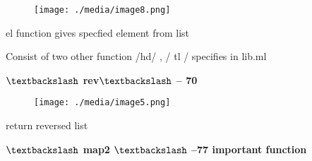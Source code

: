 \documentclass[12pt]{article}
\renewcommand{\_}{\kern-1.5pt\textunderscore\kern-1.5pt}
\begin{document}
\begin{figure}[H]
	\begin{Center}
		\texttt{[image: ./media/image8.png]}
	\end{Center}
\end{figure}



\par


\vspace{\baselineskip}

\vspace{\baselineskip}
{\fontsize{14pt}{16.8pt}\selectfont el function gives specfied element from list\par}\par

{\fontsize{14pt}{16.8pt}\selectfont Consist of two other function /hd/ , / tl / specifies in lib.ml\par}\par


\vspace{\baselineskip}
{\fontsize{14pt}{16.8pt}\selectfont \textbf{$\textbackslash$ rev$\textbackslash$  -- 70}\par}\par


\vspace{\baselineskip}



\begin{figure}[H]
	\begin{Center}
		\texttt{[image: ./media/image5.png]}
	\end{Center}
\end{figure}



\par

{\fontsize{14pt}{16.8pt}\selectfont return reversed list\par}\par


\vspace{\baselineskip}
{\fontsize{14pt}{16.8pt}\selectfont \textbf{$\textbackslash$  map2 $\textbackslash$  --77 important function}\par}\par
\end{document}
